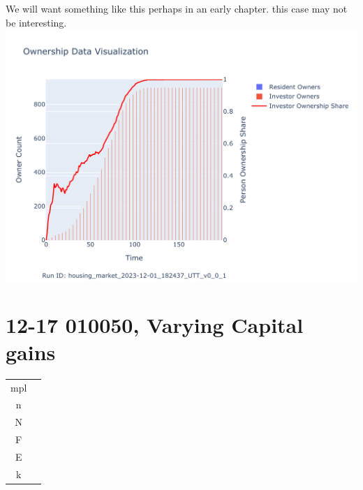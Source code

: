 \documentclass{article}
\begin{document}


We will want something like this perhaps in an early chapter. this case may not be interesting.
\includegraphics[scale=.95]{fig/Analysis/Ownership_Data_1.pdf}

\newpage


 \section{12-17 010050, Varying Capital gains  }
\begin{tabular}{c|c}
  mpl  &  \\
  n   &  \\
  N   &  \\
  F   &  \\
  E   &  \\
  k   & 
\end{tabular} 
\end{document}
